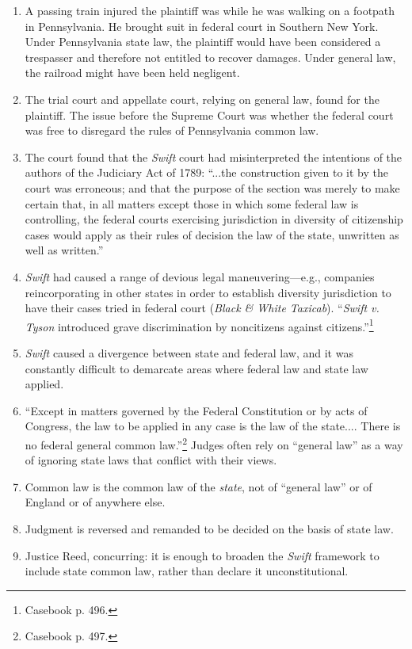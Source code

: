 \begin{enumerate}
    \item A passing train injured the plaintiff was while he was walking on a footpath in Pennsylvania. He brought suit in federal court in Southern New York. Under Pennsylvania state law, the plaintiff would have been considered a trespasser and therefore not entitled to recover damages. Under general law, the railroad might have been held negligent.
    \item The trial court and appellate court, relying on general law, found for the plaintiff. The issue before the Supreme Court was whether the federal court was free to disregard the rules of Pennsylvania common law.
    \item The court found that the \emph{Swift} court had misinterpreted the intentions of the authors of the Judiciary Act of 1789: ``...the construction given to it by the court was erroneous; and that the purpose of the section was merely to make certain that, in all matters except those in which some federal law is controlling, the federal courts exercising jurisdiction in diversity of citizenship cases would apply as their rules of decision the law of the state, unwritten as well as written.''
    \item \emph{Swift} had caused a range of devious legal maneuvering---e.g., companies reincorporating in other states in order to establish diversity jurisdiction to have their cases tried in federal court (\emph{Black \& White Taxicab}). ``\emph{Swift v. Tyson} introduced grave discrimination by noncitizens against citizens.''\footnote{Casebook p. 496.}
    \item \emph{Swift} caused a divergence between state and federal law, and it was constantly difficult to demarcate areas where federal law and state law applied.
    \item ``Except in matters governed by the Federal Constitution or by acts of Congress, the law to be applied in any case is the law of the state.... There is no federal general common law.''\footnote{Casebook p. 497.} Judges often rely on ``general law'' as a way of ignoring state laws that conflict with their views.
    \item Common law is the common law of the \emph{state}, not of ``general law'' or of England or of anywhere else.
    \item Judgment is reversed and remanded to be decided on the basis of state law.
    \item Justice Reed, concurring: it is enough to broaden the \emph{Swift} framework to include state common law, rather than declare it unconstitutional.
\end{enumerate}

